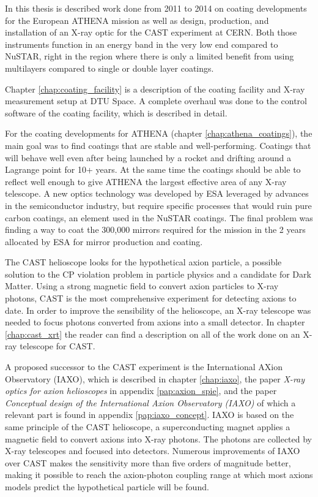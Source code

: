 In this thesis is described work done from 2011 to 2014 on coating developments for the European ATHENA mission as well as design, production, and installation of an X-ray optic for the CAST experiment at CERN. Both those instruments function in an energy band in the very low end compared to NuSTAR, right in the region where there is only a limited benefit from using multilayers compared to single or double layer coatings.

Chapter \ref{chap:coating_facility} is a description of the coating facility and X-ray measurement setup at DTU Space. A complete overhaul was done to the control software of the coating facility, which is described in detail.

For the coating developments for ATHENA (chapter \ref{chap:athena_coatings}), the main goal was to find coatings that are stable and well-performing. Coatings that will behave well even after being launched by a rocket and drifting around a Lagrange point for 10+ years. At the same time the coatings should be able to reflect well enough to give ATHENA the largest effective area of any X-ray telescope. A new optics technology was developed by ESA leveraged by advances in the semiconductor industry, but require specific processes that would ruin pure carbon coatings, an element used in the NuSTAR coatings. The final problem was finding a way to coat the 300,000 mirrors required for the mission in the 2 years allocated by ESA for mirror production and coating.

The CAST helioscope looks for the hypothetical axion particle, a possible solution to the CP violation problem in particle physics and a candidate for Dark Matter. Using a strong magnetic field to convert axion particles to X-ray photons, CAST is the most comprehensive experiment for detecting axions to date. In order to improve the sensibility of the helioscope, an X-ray telescope was needed to focus photons converted from axions into a small detector. In chapter \ref{chap:cast_xrt} the reader can find a description on all of the work done on an X-ray telescope for CAST.

A proposed successor to the CAST experiment is the International AXion Observatory (IAXO), which is described in chapter \ref{chap:iaxo}, the paper \emph{X-ray optics for axion helioscopes} in appendix \ref{pap:axion_spie}, and the paper \emph{Conceptual design of the International Axion Observatory (IAXO)} of which a relevant part is found in appendix \ref{pap:iaxo_concept}. IAXO is based on the same principle of the CAST helioscope, a superconducting magnet applies a magnetic field to convert axions into X-ray photons. The photons are collected by X-ray telescopes and focused into detectors. Numerous improvements of IAXO over CAST makes the sensitivity more than five orders of magnitude better, making it possible to reach the axion-photon coupling range at which most axions models predict the hypothetical particle will be found.

